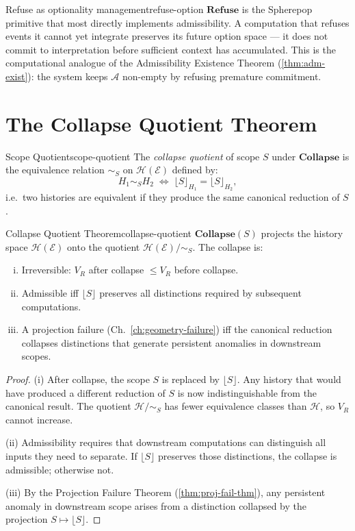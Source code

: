 \documentclass[12pt,twoside,openright]{book}
\newcommand{\csicon} {\marginpar{\tiny\color{DistBlue}\faCode}}
\newcommand{\hist}{\mathcal{H}}
\newcommand{\adm}{\mathcal{A}}
\begin{document}
\begin{remark}{Refuse as optionality management}{refuse-option}
  \csicon
  $\mathbf{Refuse}$ is the Spherepop primitive that most
  directly implements admissibility. A computation that
  refuses events it cannot yet integrate preserves its
  future option space — it does not commit to
  interpretation before sufficient context has accumulated.
  This is the computational analogue of the Admissibility
  Existence Theorem (\cref{thm:adm-exist}): the system
  keeps $\adm$ non-empty by refusing premature commitment.
\end{remark}

\section{The Collapse Quotient Theorem}

\begin{definition}{Scope Quotient}{scope-quotient}
  The \emph{collapse quotient} of scope $S$ under
  $\mathbf{Collapse}$ is the equivalence relation
  $\sim_S$ on $\hist(\mathcal{E})$ defined by:
  \[
    H_1 \sim_S H_2
    \;\iff\;
    \lfloor S \rfloor_{H_1} = \lfloor S \rfloor_{H_2},
  \]
  i.e.\ two histories are equivalent if they produce
  the same canonical reduction of $S$.
\end{definition}

\begin{theorem}{Collapse Quotient Theorem}{collapse-quotient}
  $\mathbf{Collapse}(S)$ projects the history space
  $\hist(\mathcal{E})$ onto the quotient
  $\hist(\mathcal{E})/{\sim_S}$.
  The collapse is:
  \begin{enumerate}[(i)]
    \item Irreversible: $V_R$ after collapse
          $\le V_R$ before collapse.
    \item Admissible iff $\lfloor S \rfloor$ preserves
          all distinctions required by subsequent
          computations.
    \item A projection failure (Ch.~\ref{ch:geometry-failure})
          iff the canonical reduction collapses
          distinctions that generate persistent anomalies
          in downstream scopes.
  \end{enumerate}
\end{theorem}

\begin{proof}
  (i) After collapse, the scope $S$ is replaced by
  $\lfloor S \rfloor$. Any history that would have
  produced a different reduction of $S$ is now
  indistinguishable from the canonical result.
  The quotient $\hist/{\sim_S}$ has fewer equivalence
  classes than $\hist$, so $V_R$ cannot increase.

  (ii) Admissibility requires that downstream
  computations can distinguish all inputs they need to
  separate. If $\lfloor S \rfloor$ preserves those
  distinctions, the collapse is admissible; otherwise not.

  (iii) By the Projection Failure Theorem
  (\cref{thm:proj-fail-thm}), any persistent anomaly
  in downstream scope arises from a distinction collapsed
  by the projection $S \mapsto \lfloor S \rfloor$.
\end{proof}
\end{document}
